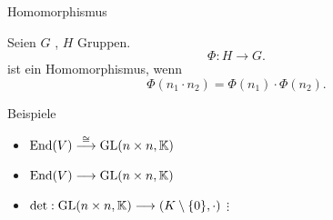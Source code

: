 \documentclass[class=article, crop=false]{standalone}
\begin{document}
\begin{zettel}{Homomorphismus}
\begin{flashcard}
    \begin{definition}[Homomorphismus]

        Seien $G$ , $H$ Gruppen.
\[
    \Phi: H \longrightarrow G
.\]
ist ein Homomorphismus, wenn
\[
    \Phi (n_1 \cdot n_2 ) = \Phi (n_1) \cdot \Phi (n_2)
.\]
    
\end{definition}
\end{flashcard}

\begin{example}[Homomorphismen]
Beispiele
    \begin{itemize}
        \item $\operatorname{End}(V) \stackrel{\cong}{\longrightarrow}  \operatorname{GL}(n \times n,\mathbb{K}) $ 
        \item $\operatorname{End}(V) \longrightarrow  \operatorname{GL}(n \times n,\mathbb{K}) $ 
        \item $ \det: \GL(n \times n,\K) \longrightarrow (K \setminus \set{0},\cdot )$ 
    $\vdots$
    \end{itemize}
    
\end{example}

\end{zettel}
\end{document}
